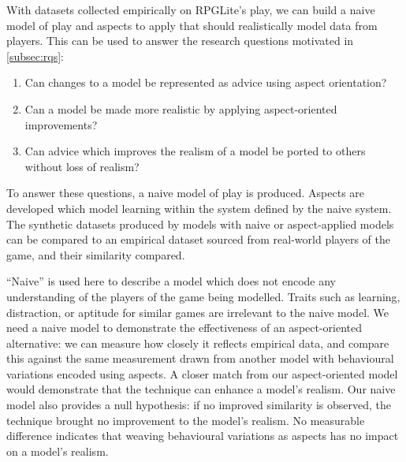 With datasets collected empirically on RPGLite's play, we can build a naive
model of play and aspects to apply that should realistically model data from
players. This can be used to answer the research questions motivated in
\cref{subsec:rqs}:

\begin{researchquestion}
  \begin{enumerate}
    \item Can changes to a model be represented as advice using aspect orientation?
    \item Can a model be made more realistic by applying aspect-oriented improvements?
    \item Can advice which improves the realism of a model be ported to others without loss of realism?
  \end{enumerate}
\end{researchquestion}


To answer these questions, a naive model of play is produced. Aspects are
developed which model learning within the system defined by the naive system.
The synthetic datasets produced by models with naive or aspect-applied models
can be compared to an empirical dataset sourced from real-world players of the
game, and their similarity compared.

``Naive'' is used here to describe a model which does not encode any
understanding of the players of the game being modelled. Traits such as
learning, distraction, or aptitude for similar games are irrelevant to the naive
model. We need a naive model to demonstrate the effectiveness of an
aspect-oriented alternative: we can measure how closely it reflects empirical
data, and compare this against the same measurement drawn from another model
with behavioural variations encoded using aspects. A closer match from our
aspect-oriented model would demonstrate that the technique can enhance a model's
realism. Our naive model also provides a null hypothesis: if no improved
similarity is observed, the technique brought no improvement to the model's
realism. No measurable difference indicates that weaving behavioural variations
as aspects has no impact on a model's realism.

